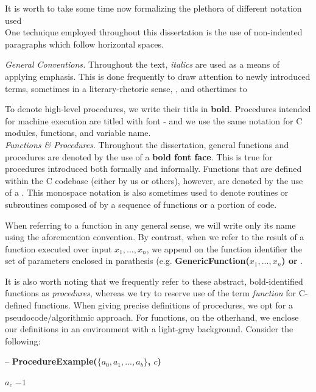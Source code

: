 It is worth to take some time now formalizing the plethora of different notation used\\

One technique employed throughout this dissertation is the use of non-indented paragraphs which follow horizontal spaces. 

\noindent
\textit{General Conventions.} Throughout the text, \textit{italics} are used as a means of applying emphasis. This is done frequently to draw attention to newly introduced terms, sometimes in a literary-rhetoric sense, , and othertimes to 

To denote high-level procedures, we write their titls in \textbf{bold}. Procedures intended for machine execution are titled with  font - and we use the same notation for C modules, functions, and variable name.\\

\noindent
\textit{Functions \& Procedures}. Throughout the dissertation, general functions and procedures are denoted by the use of a \textbf{bold font face}. This is true for procedures introduced both formally and informally. Functions that are defined within the \sidh C codebase (either by us or others), however, are denoted by the use of a . This monospace notation is also sometimes used to denote routines or subroutines composed of by a sequence of functions or a portion of code. 

When referring to a function in any general sense, we will write only its name using the aforemention convention. By contrast, when we refer to the result of a function executed over input $x_{1}, ..., x_{n}$, we append on the function identifier the set of parameters enclosed in parathesis (e.g. \textbf{GenericFunction($x_{1}, ..., x_{n}$) or }. 

It is also worth noting that we frequently refer to these abstract, bold-identified functions as \textit{procedures}, whereas we try to reserve use of the term \textit{function} for C-defined \sidh functions. When giving precise definitions of procedures, we opt for a pseudocode/algorithmic approach. For functions, on the otherhand, we enclose our definitions in an environment with a light-gray background. Consider the following: \\

\begin{algorithm}
\caption{-- \textbf{ProcedureExample($\{a_0, a_1, ... , a_b\}$, $c$)}}\label{alg:procedureexample}
\begin{algorithmic}[1]
	\State \Return $a_c$
\Else
	\State \Return $-1$
\EndIf
\end{algorithmic}
\end{algorithm}

